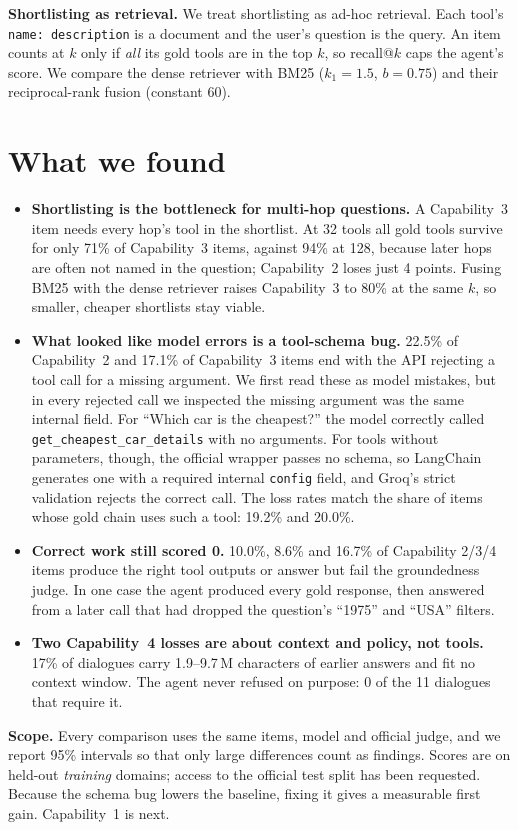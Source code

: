 \documentclass[10pt]{article}
\begin{document}
\vspace{0.3em}
\textbf{Shortlisting as retrieval.} We treat shortlisting as ad-hoc retrieval. Each tool's
\mbox{\texttt{name: description}} is a document and the user's question is the query. An item
counts at $k$ only if \emph{all} its gold tools are in the top $k$, so recall@$k$ caps the agent's
score. We
compare the dense retriever with BM25 ($k_1{=}1.5$, $b{=}0.75$) and their reciprocal-rank fusion
(constant 60).

\section{What we found}
\begin{itemize}
\item \textbf{Shortlisting is the bottleneck for multi-hop questions.} A Capability~3 item needs
  every hop's tool in the shortlist. At 32 tools all gold tools survive for only 71\% of
  Capability~3 items, against 94\% at 128, because later hops are often not named in the
  question; Capability~2 loses just 4 points. Fusing BM25 with the dense retriever raises
  Capability~3 to 80\% at the same $k$, so smaller, cheaper shortlists stay viable.
\item \textbf{What looked like model errors is a tool-schema bug.} 22.5\% of Capability~2 and
  17.1\% of Capability~3 items end with the API rejecting a tool call for a missing argument.
  We first read these as model mistakes, but in every rejected call we inspected the missing
  argument was the same internal field. For ``Which car is the cheapest?'' the model correctly called
  \texttt{get\_cheapest\_car\_details} with no arguments. For tools without parameters, though,
  the official wrapper passes no schema, so LangChain generates one with a required internal
  \texttt{config} field, and Groq's strict validation rejects the correct call. The loss rates
  match the share of items whose gold chain uses such a tool: 19.2\% and 20.0\%.
\item \textbf{Correct work still scored 0.} 10.0\%, 8.6\% and 16.7\% of Capability 2/3/4 items
  produce the right tool outputs or answer but fail the groundedness judge. In one case the
  agent produced every gold response, then answered from a later call that had dropped the
  question's ``1975'' and ``USA'' filters.
\item \textbf{Two Capability~4 losses are about context and policy, not tools.} 17\% of dialogues carry 1.9--9.7\,M
  characters of earlier answers and fit no context window. The agent never refused on purpose:
  0 of the 11 dialogues that require it.
\end{itemize}

\textbf{Scope.} Every comparison uses the same items, model and official judge, and we report 95\%
intervals so that only large differences count as findings. Scores are on held-out
\emph{training} domains; access to the official test split has been requested. Because the
schema bug lowers the baseline, fixing it gives a measurable first gain. Capability~1 is next.
\end{document}
